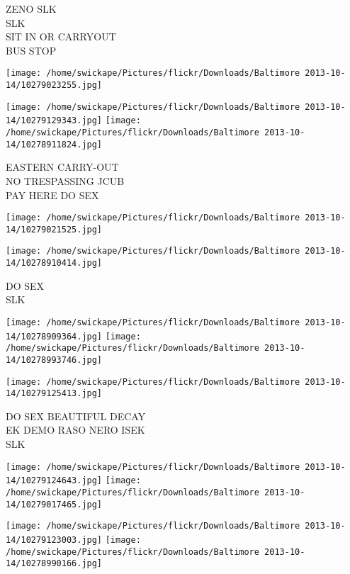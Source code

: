 \documentclass[10pt,letterpaper]{article}
\begin{document}
ZENO SLK\\
SLK\\
SIT IN OR CARRYOUT\\
BUS STOP\\
\pagebreak

\texttt{[image: /home/swickape/Pictures/flickr/Downloads/Baltimore 2013-10-14/10279023255.jpg]}

\vspace{0.25in}
\texttt{[image: /home/swickape/Pictures/flickr/Downloads/Baltimore 2013-10-14/10279129343.jpg]}
\texttt{[image: /home/swickape/Pictures/flickr/Downloads/Baltimore 2013-10-14/10278911824.jpg]}

EASTERN CARRY{-}OUT\\
NO TRESPASSING JCUB\\
PAY HERE DO SEX\\
\pagebreak

\texttt{[image: /home/swickape/Pictures/flickr/Downloads/Baltimore 2013-10-14/10279021525.jpg]}

\vspace{0.25in}
\texttt{[image: /home/swickape/Pictures/flickr/Downloads/Baltimore 2013-10-14/10278910414.jpg]}

DO SEX\\
SLK\\
\pagebreak

\texttt{[image: /home/swickape/Pictures/flickr/Downloads/Baltimore 2013-10-14/10278909364.jpg]}
\texttt{[image: /home/swickape/Pictures/flickr/Downloads/Baltimore 2013-10-14/10278993746.jpg]}

\vspace{0.25in}
\texttt{[image: /home/swickape/Pictures/flickr/Downloads/Baltimore 2013-10-14/10279125413.jpg]}

DO SEX BEAUTIFUL DECAY\\
EK DEMO RASO NERO ISEK\\
SLK\\
\pagebreak

\texttt{[image: /home/swickape/Pictures/flickr/Downloads/Baltimore 2013-10-14/10279124643.jpg]}
\texttt{[image: /home/swickape/Pictures/flickr/Downloads/Baltimore 2013-10-14/10279017465.jpg]}

\texttt{[image: /home/swickape/Pictures/flickr/Downloads/Baltimore 2013-10-14/10279123003.jpg]}
\texttt{[image: /home/swickape/Pictures/flickr/Downloads/Baltimore 2013-10-14/10278990166.jpg]}
\end{document}
